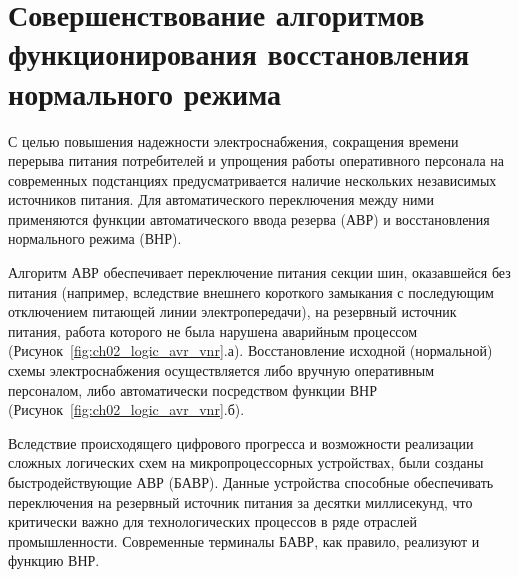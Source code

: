 
\section[Совершенствование алгоритмов функционирования восстановления нормального режима]{Совершенствование алгоритмов функционирования восстановления нормального режима}
\label{sec:ch02_vnr_algorithms}

С целью повышения надежности электроснабжения, сокращения времени перерыва питания
потребителей и упрощения работы оперативного персонала
\cite{bavr_bib_040_sto_2012,bavr_bib_041_sto_2009} на современных подстанциях
предусматривается наличие нескольких независимых источников питания. Для автоматического
переключения между ними применяются функции автоматического ввода резерва (АВР) и
восстановления нормального режима (ВНР).\par\vspace{0.2cm}

Алгоритм АВР обеспечивает переключение питания секции шин, оказавшейся без питания
(например, вследствие внешнего короткого замыкания с последующим отключением питающей
линии электропередачи), на резервный источник питания, работа которого не была нарушена
аварийным процессом (Рисунок~\ref{fig:ch02_logic_avr_vnr}.а). Восстановление исходной
(нормальной) схемы электроснабжения осуществляется либо вручную оперативным персоналом,
либо автоматически посредством функции ВНР
(Рисунок~\ref{fig:ch02_logic_avr_vnr}.б).\par\vspace{0.2cm}

Вследствие происходящего цифрового прогресса и возможности реализации сложных логических
схем на микропроцессорных устройствах, были созданы быстродействующие АВР (БАВР). Данные
устройства способные обеспечивать переключения на резервный источник питания за десятки
миллисекунд, что критически важно для технологических процессов в ряде отраслей
промышленности. Современные терминалы БАВР, как правило, реализуют и функцию
ВНР.\par\vspace{0.2cm}

